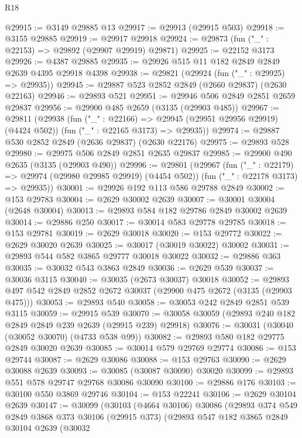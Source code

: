 \begin{lexlean}{R18}
\begin{coremodule}
@29915 := @3149 @29885 @13
@29917 := @29913 (@29915 @503)
@29918 := @3155 @29885
@29919 := @29917 @29918
@29924 := @29873 (fun ("_" : @22153) => @29892 (@29907 @29919) @29871)
@29925 := @22152 @3173
@29926 := @4387 @29885
@29935 := @29926 @515 @11 @182 @2849 @2849 @2639 @4395 @29918 @4398
@29938 := @29821 (@29924 (fun ("_" : @29925) => @29935))
@29945 := @29887 @523 @2852 @2849 (@2660 @29837) (@2630 @22163)
@29946 := @29893 @521
@29951 := @29946 @506 @2849 @2851 @2659 @29837
@29956 := @29900 @485 @2659 (@3135 (@29903 @485))
@29967 := @29811
    (@29938
      (fun ("_" : @22166) => @29945 (@29951 @29956 @29919) (@4424 @502))
      (fun ("_" : @22165 @3173) => @29935))
@29974 := @29887 @530 @2852 @2849 (@2636 @29837) (@2630 @22176)
@29975 := @29893 @528
@29980 := @29975 @506 @2849 @2851 @2635 @29837
@29985 := @29900 @490 @2635 (@3135 (@29903 @490))
@29996 := @29801
    (@29967
      (fun ("_" : @22179) => @29974 (@29980 @29985 @29919) (@4454 @502))
      (fun ("_" : @22178 @3173) => @29935))
@30001 := @29926 @192 @113 @586 @29788 @2849
@30002 := @153 @29783
@30004 := @2629 @30002 @2639
@30007 := @30001 @30004 (@2648 @30004)
@30013 := @29893 @584 @182 @29786 @2849 @30002 @2639
@30014 := @29886 @250
@30017 := @30014 @583 @29778 @29785
@30018 := @153 @29781
@30019 := @2629 @30018
@30020 := @153 @29772
@30022 := @2629 @30020 @2639
@30025 := @30017 (@30019 @30022) @30002
@30031 := @29893 @544 @582 @3865 @29777 @30018 @30022
@30032 := @29886 @363
@30035 := @30032 @543 @3863 @2849
@30036 := @2629 @539
@30037 := @30036 @3115
@30040 := @30035 (@2673 @30037) @30018
@30052 := @29893 @497 @542 @2849 @2852 @2672 @30037 (@29900 @475 @2672 (@3135 (@29903 @475)))
@30053 := @29893 @540
@30058 := @30053 @242 @2849 @2851 @539 @3115
@30059 := @29915 @539
@30070 := @30058 @30059 (@29893 @240 @182 @2849 @2849 @239 @2639 (@29915 @239) @29918)
@30076 := @30031 (@30040 (@30052 @30070) (@4733 @538 @99))
@30082 := @29893 @580 @182 @29775 @2849 @30020 @2639
@30085 := @30014 @579 @29769 @29774
@30086 := @153 @29744
@30087 := @2629 @30086
@30088 := @153 @29763
@30090 := @2629 @30088 @2639
@30093 := @30085 (@30087 @30090) @30020
@30099 := @29893 @551 @578 @29747 @29768 @30086 @30090
@30100 := @29886 @176
@30103 := @30100 @550 @3869 @29746
@30104 := @153 @22241
@30106 := @2629 @30104 @2639
@30147 := @30099
    (@30103
      (@4664 @30106)
      @30086
      (@29893
        @374
        @549
        @2849
        @3868
        @373
        @30106
        (@29915 @373)
        (@29893
          @547
          @182
          @3865
          @2849
          @30104
          @2639
          (@30032

\end{coremodule}
\end{lexlean}
